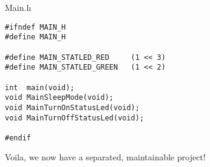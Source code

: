 \documentclass[a4paper,oneside,notitlepage]{article}
\begin{document}
Main.h
\begin{center}
\begin{lstlisting}
#ifndef MAIN_H
#define MAIN_H

#define MAIN_STATLED_RED     (1 << 3)
#define MAIN_STATLED_GREEN   (1 << 2)

int  main(void);
void MainSleepMode(void);
void MainTurnOnStatusLed(void);
void MainTurnOffStatusLed(void);

#endif
\end{lstlisting}
\end{center}

Voila, we now have a separated, maintainable project!
\end{document}
